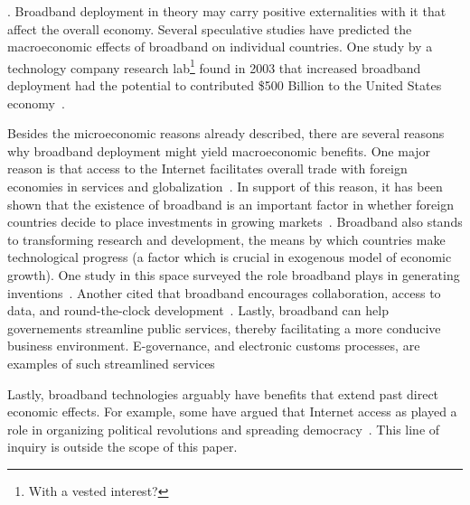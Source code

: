 . Broadband deployment in theory may
carry positive externalities with it that affect the overall economy.
Several speculative studies have predicted the macroeconomic effects of broadband
on individual countries. One study by a technology company research
lab\footnote{With a vested interest?}
 found in 2003 that increased broadband deployment had the potential to contributed \$500 Billion to the United States
 economy~\cite{saksena2003igniting}.

 Besides the microeconomic reasons already described, there are several reasons why broadband deployment
 might yield macroeconomic benefits. One major reason is that access to the Internet facilitates overall trade with foreign economies
 in services and globalization~\cite{attendusing}. In support of this reason, it has been shown that the existence of broadband
 is an important factor in whether foreign countries decide to place investments in growing markets~\cite{abramovsky2006outsourcing}.
 Broadband also stands to transforming research and development, the means by which countries make technological progress (a factor
 which is crucial in exogenous model of economic growth). One study in this space surveyed the role broadband plays in generating
 inventions~\cite{carlaw2007past}. Another cited that broadband encourages collaboration, access to data, and round-the-clock
 development~\cite{van2008broadband}. Lastly, broadband can help governements streamline public services, thereby facilitating
 a more conducive business environment. E-governance, and electronic customs processes, are examples of such streamlined
 services~\cite{de2004customs}

Lastly, broadband technologies arguably have benefits that extend past direct economic effects. For example,
some have argued that Internet access as played a role in organizing political revolutions and spreading
democracy~\cite{zhang2010revolution}. This line of inquiry is outside the scope of this paper.
